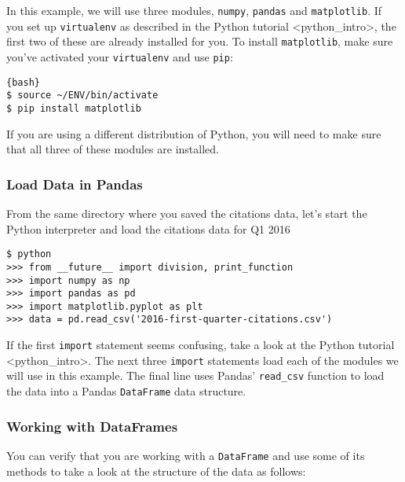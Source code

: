 In this example, we will use three modules, \texttt{numpy},
\texttt{pandas} and \texttt{matplotlib}. If you set up
\texttt{virtualenv} as described in the
Python tutorial \textless{}python\_intro\textgreater{}, the first two of
these are already installed for you. To install \texttt{matplotlib},
make sure you've activated your \texttt{virtualenv} and use
\texttt{pip}:

\begin{lstlisting}{bash}
$ source ~/ENV/bin/activate
$ pip install matplotlib
\end{lstlisting}

If you are using a different distribution of Python, you will need to
make sure that all three of these modules are installed.

\subsubsection{Load Data in Pandas}\label{load-data-in-pandas}

From the same directory where you saved the citations data, let's start
the Python interpreter and load the citations data for Q1 2016

\begin{lstlisting}
$ python
>>> from __future__ import division, print_function
>>> import numpy as np
>>> import pandas as pd
>>> import matplotlib.pyplot as plt
>>> data = pd.read_csv('2016-first-quarter-citations.csv')
\end{lstlisting}

If the first \texttt{import} statement seems confusing, take a look at
the Python tutorial \textless{}python\_intro\textgreater{}. The next
three \texttt{import} statements load each of the modules we will use in
this example. The final line uses Pandas' \verb|read_csv| function to
load the data into a Pandas \texttt{DataFrame} data structure.

\subsubsection{Working with DataFrames}\label{working-with-dataframes}

You can verify that you are working with a \texttt{DataFrame} and use
some of its methods to take a look at the structure of the data as
follows:

